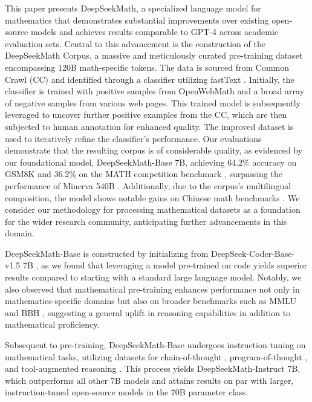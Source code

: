 This paper presents DeepSeekMath, a specialized language model for mathematics that demonstrates substantial improvements over existing open-source models and achieves results comparable to GPT-4 across academic evaluation sets. Central to this advancement is the construction of the DeepSeekMath Corpus, a massive and meticulously curated pre-training dataset encompassing 120B math-specific tokens. The data is sourced from Common Crawl (CC) and identified through a classifier utilizing fastText \citep{joulin2016fasttext}. Initially, the classifier is trained with positive samples from OpenWebMath \citep{openwebmath} and a broad array of negative samples from various web pages. This trained model is subsequently leveraged to uncover further positive examples from the CC, which are then subjected to human annotation for enhanced quality. The improved dataset is used to iteratively refine the classifier’s performance. Our evaluations demonstrate that the resulting corpus is of considerable quality, as evidenced by our foundational model, DeepSeekMath-Base 7B, achieving 64.2\% accuracy on GSM8K \citep{gsm8k} and 36.2\% on the MATH competition benchmark \citep{MATH}, surpassing the performance of Minerva 540B \citep{minerva}. Additionally, due to the corpus’s multilingual composition, the model shows notable gains on Chinese math benchmarks \citep{wei2023cmath,agieval}. We consider our methodology for processing mathematical datasets as a foundation for the wider research community, anticipating further advancements in this domain.

DeepSeekMath-Base is constructed by initializing from DeepSeek-Coder-Base-v1.5 7B \citep{deepseek-coder}, as we found that leveraging a model pre-trained on code yields superior results compared to starting with a standard large language model. Notably, we also observed that mathematical pre-training enhances performance not only in mathematics-specific domains but also on broader benchmarks such as MMLU \citep{mmlu} and BBH \citep{bbh}, suggesting a general uplift in reasoning capabilities in addition to mathematical proficiency.

Subsequent to pre-training, DeepSeekMath-Base undergoes instruction tuning on mathematical tasks, utilizing datasets for chain-of-thought \citep{cot}, program-of-thought \citep{pot,pal}, and tool-augmented reasoning \citep{tora}. This process yields DeepSeekMath-Instruct 7B, which outperforms all other 7B models and attains results on par with larger, instruction-tuned open-source models in the 70B parameter class.

